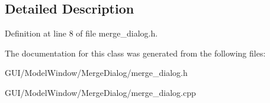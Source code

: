 \subsection{Detailed Description}


Definition at line 8 of file merge\+\_\+dialog.\+h.



The documentation for this class was generated from the following files\+:\begin{DoxyCompactItemize}
\item 
G\+U\+I/\+Model\+Window/\+Merge\+Dialog/merge\+\_\+dialog.\+h\item 
G\+U\+I/\+Model\+Window/\+Merge\+Dialog/merge\+\_\+dialog.\+cpp\end{DoxyCompactItemize}
